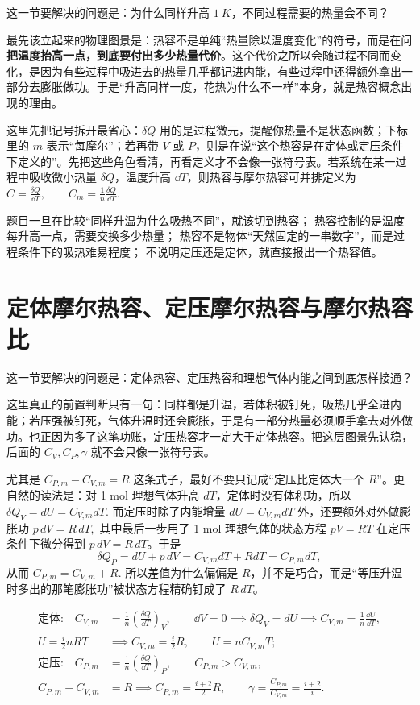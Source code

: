 \documentclass[lang=cn,11pt]{elegantbook}
\newcommand{\bridge}[1]{\begin{note}#1\end{note}}
\begin{document}
这一节要解决的问题是：为什么同样升高 \(\SI{1}{K}\)，不同过程需要的热量会不同？

最先该立起来的物理图景是：热容不是单纯“热量除以温度变化”的符号，而是在问\textbf{把温度抬高一点，到底要付出多少热量代价}。这个代价之所以会随过程不同而变化，是因为有些过程中吸进去的热量几乎都记进内能，有些过程中还得额外拿出一部分去膨胀做功。于是“升高同样一度，花热为什么不一样”本身，就是热容概念出现的理由。

这里先把记号拆开最省心：\(\delta Q\) 用的是过程微元，提醒你热量不是状态函数；下标里的 \(m\) 表示“每摩尔”；若再带 \(V\) 或 \(P\)，则是在说“这个热容是在定体或定压条件下定义的”。先把这些角色看清，再看定义才不会像一张符号表。若系统在某一过程中吸收微小热量 \(\delta Q\)，温度升高 \(\dd T\)，则热容与摩尔热容可并排定义为
 \(C=\frac{\delta Q}{\dd T},\qquad C_m=\frac{1}{n}\frac{\delta Q}{\dd T}.\) 

\begin{note}
 题目一旦在比较“同样升温为什么吸热不同”，就该切到热容； 热容控制的是温度每升高一点，需要交换多少热量； 热容不是物体“天然固定的一串数字”，而是过程条件下的吸热难易程度； 不说明定压还是定体，就直接报出一个热容值。
\end{note}

\section{定体摩尔热容、定压摩尔热容与摩尔热容比}

这一节要解决的问题是：定体热容、定压热容和理想气体内能之间到底怎样接通？

\bridge{这里真正的前置判断只有一句：同样都是升温，若体积被钉死，吸热几乎全进内能；若压强被钉死，气体升温时还会膨胀，于是有一部分热量必须顺手拿去对外做功。也正因为多了这笔功账，定压热容才一定大于定体热容。把这层图景先认稳，后面的 \(C_V,C_P,\gamma\) 就不会只像一张符号表。}

尤其是
 \(C_{P,m}-C_{V,m}=R\) 
这条式子，最好不要只记成“定压比定体大一个 \(R\)”。更自然的读法是：对 1 mol 理想气体升高 \(dT\)，定体时没有体积功，所以
 \(\delta Q_V=dU=C_{V,m}dT.\) 
而定压时除了内能增量 \(dU=C_{V,m}dT\) 外，还要额外对外做膨胀功
 \(p\,dV=R\,dT,\) 
其中最后一步用了 1 mol 理想气体的状态方程 \(pV=RT\) 在定压条件下微分得到 \(p\,dV=R\,dT\)。于是
\[
\delta Q_P=dU+p\,dV=C_{V,m}dT+RdT=C_{P,m}dT,
\]
从而
 \(C_{P,m}=C_{V,m}+R.\) 
所以差值为什么偏偏是 \(R\)，并不是巧合，而是“等压升温时多出的那笔膨胀功”被状态方程精确钉成了 \(R\,dT\)。

\begin{align*}
\text{定体:}\quad C_{V,m}&=\frac{1}{n}\left(\frac{\delta Q}{\dd T}\right)_V,\qquad
\dd V=0 \implies \delta Q_V=dU \implies C_{V,m}=\frac{1}{n}\frac{\dd U}{\dd T},\\
U=\frac{i}{2}nRT &\implies C_{V,m}=\frac{i}{2}R,\qquad U=nC_{V,m}T;\\
\text{定压:}\quad C_{P,m}&=\frac{1}{n}\left(\frac{\delta Q}{\dd T}\right)_P,\qquad C_{P,m}>C_{V,m},\\
C_{P,m}-C_{V,m}&=R \implies C_{P,m}=\frac{i+2}{2}R,\qquad \gamma=\frac{C_{P,m}}{C_{V,m}}=\frac{i+2}{i}.
\end{align*}
\end{document}
